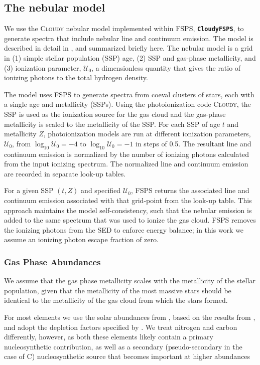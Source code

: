 \documentclass[preprint2]{aastex61}
\newcommand{\FSPS}{{\sc FSPS}\xspace}
\newcommand{\CloudyFSPS}{{\tt \textbf{CloudyFSPS}}\xspace}
\newcommand{\Cloudy}{\textsc{Cloudy}\xspace}
\newcommand{\logten}{\ensuremath{\log_{10}}}
\newcommand{\U}{\ensuremath{\mathcal{U}_{0}}\xspace}
\newcommand{\logUeq}[1]{\ensuremath{\logten \mathcal{U}_0 = #1}}
\begin{document}
\subsection{The nebular model}\label{sec:model:neb}
We use the \Cloudy nebular model implemented within \FSPS, \CloudyFSPS \citep{cloudyFSPSv1}, to generate spectra that include nebular line and continuum emission. The model is described in detail in \citet{Byler+2016}, and summarized briefly here. The nebular model is a grid in (1) simple stellar population (SSP) age, (2) SSP and gas-phase metallicity, and (3) ionization parameter, \U, a dimensionless quantity that gives the ratio of ionizing photons to the total hydrogen density.

The model uses \FSPS to generate spectra from coeval clusters of stars, each with a single age and metallicity (SSPs). Using the photoionization code \Cloudy, the SSP is used as the ionization source for the gas cloud and the gas-phase metallicity is scaled to the metallicity of the SSP. For each SSP of age $t$ and metallicity $Z$, photoionization models are run at different ionization parameters, \U, from \logUeq{-4} to \logUeq{-1} in steps of 0.5. The resultant line and continuum emission is normalized by the number of ionizing photons calculated from the input ionizing spectrum. The normalized line and continuum emission are recorded in separate look-up tables. 

For a given SSP $(t, Z)$ and specified \U{}, \FSPS returns the associated line and continuum emission associated with that grid-point from the look-up table. This approach maintains the model self-consistency, such that the nebular emission is added to the same spectrum that was used to ionize the gas cloud. \FSPS removes the ionizing photons from the SED to enforce energy balance; in this work we assume an ionizing photon escape fraction of zero.

\subsubsection{Gas Phase Abundances}

We assume that the gas phase metallicity scales with the metallicity of the stellar population, given that the metallicity of the most massive stars should be identical to the metallicity of the gas cloud from which the stars formed. 

For most elements we use the solar abundances from \citet{Grevesse+2010}, based on the results from \citet{Asplund+2009}, and adopt the depletion factors specified by \citet{Dopita+2013}. We treat nitrogen and carbon differently, however, as both these elements likely contain a primary nucleosynthetic contribution, as well as a secondary (pseudo-secondary in the case of C) nucleosynthetic source that becomes important at higher abundances \citep[e.g., ][]{Henry+2000, Berg+2016}
\end{document}
